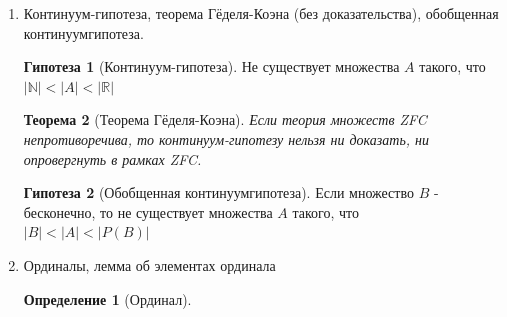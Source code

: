 \documentclass[a4paper]{article}
\newtheorem*{theorem*}{Теорема}
\theoremstyle{definition}
\newtheorem*{definition*}{Определение}
\newtheorem*{hypo}{Гипотеза}
\begin{document}
\begin{enumerate}
\begin{proof}
\begin{itemize}
\begin{enumerate}
                       \\ $u$ - инъекция, тогда $f(x,y)=h\circ{u}\circ{w^{-1}}(x,y)$
                \item $g: \mathbb{R}\xrightarrow[]{1-1}{\mathbb{R}\times{\mathbb{R}}}$
                      \\ Построим $g(x) = <x,0>$
               \end{enumerate}
               Т.к $f$ и $g$ - инъекции, значит значит $\left\{
                \begin{matrix}
                 |\mathbb {R} \times{\mathbb{R}|} \leq |\mathbb {R}| \\
                 |\mathbb {R} \times{\mathbb{R}|} \geq |\mathbb {R}| \\
                \end{matrix}
                \right.$
               тогда по теореме \textit{Кантора-Бернштейна} получаем, что $|\mathbb {R} \times{\mathbb{R}|} = |\mathbb {R}|$
        \end{itemize}
       \end{proof}
       \begin{theorem*}[о мощности произведения]
        Если $A, B$ - непустые множества и одно из них бесконечно, то: \\$|A\times{B}| = max\{|A|, |B|\}$
       \end{theorem*}
 \item Континуум-гипотеза, теорема Гёделя-Коэна (без доказательства), обобщенная континуумгипотеза.
       \begin{hypo}[Континуум-гипотеза] Не существует множества $A$ такого, что\\
        $\left | \mathbb{N} \right | < \left | A \right | < \left | \mathbb{R} \right |$
       \end{hypo}
       \begin{theorem*}[Теорема Гёделя-Коэна]
        Если теория множеств ZFC непротиворечива, то континуум-гипотезу нельзя ни доказать, ни опровергнуть в рамках ZFC.
       \end{theorem*}
       \begin{hypo}[Обобщенная континуумгипотеза]
        Если множество $B$ - бесконечно, то не существует множества $A$ такого, что\\ $\left | B \right | < \left | A \right | < \left | P(B) \right |$
       \end{hypo}
 \item Ординалы, лемма об элементах ординала
       \begin{definition*}[Ординал]

\end{definition*}
\end{enumerate}
\end{document}
